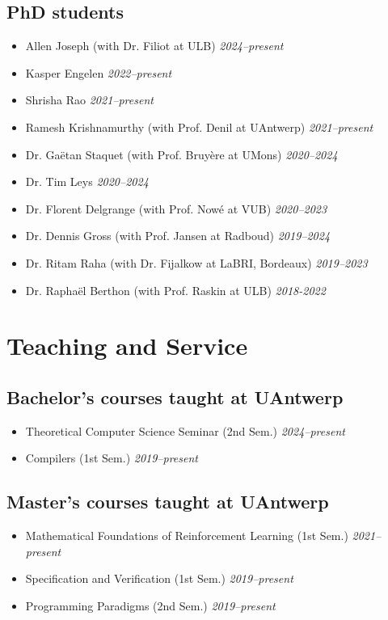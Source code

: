 \documentclass[10pt,a4paper]{moderncv}
\begin{document}
\subsection{PhD students}
\begin{itemize}
  \item Allen Joseph (with Dr. Filiot at ULB) \hfill \textit{2024--present}
  \item Kasper Engelen \hfill \textit{2022--present}
  \item Shrisha Rao \hfill \textit{2021--present}
  \item Ramesh Krishnamurthy (with Prof. Denil at UAntwerp) \hfill \textit{2021--present}
  \item Dr. Ga\"etan Staquet (with Prof. Bruy\`ere at UMons) \hfill
    \textit{2020--2024}
  \item Dr. Tim Leys \hfill \textit{2020--2024}
  \item Dr. Florent Delgrange (with Prof. Now\'e at VUB) \hfill
    \textit{2020--2023}
  \item Dr. Dennis Gross (with Prof. Jansen at Radboud) \hfill
    \textit{2019--2024} 
  \item Dr. Ritam Raha (with Dr. Fijalkow at LaBRI, Bordeaux) \hfill
    \textit{2019--2023}
  \item Dr. Rapha\"el Berthon (with Prof. Raskin at ULB) \hfill
    \textit{2018-2022}
\end{itemize}

\section{Teaching and Service}
\subsection{Bachelor's courses taught at UAntwerp}
\begin{itemize}
  \item Theoretical Computer Science Seminar (2nd Sem.) \hfill
    \textit{2024--present}
  \item Compilers (1st Sem.) \hfill \textit{2019--present}
\end{itemize}

\subsection{Master's courses taught at UAntwerp}
\begin{itemize}
  \item Mathematical Foundations of Reinforcement Learning (1st Sem.) \hfill \textit{2021--present}
  \item Specification and Verification (1st Sem.) \hfill \textit{2019--present}
  \item Programming Paradigms (2nd Sem.) \hfill \textit{2019--present}
\end{itemize}
\end{document}
